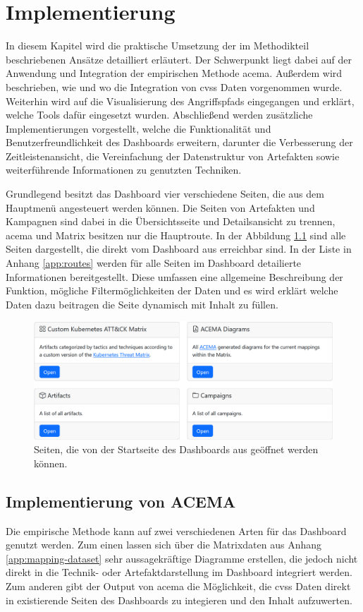 \chapter{Implementierung}
\label{chap:implementierung}
In diesem Kapitel wird die praktische Umsetzung der im Methodikteil beschriebenen Ansätze detailliert erläutert. Der Schwerpunkt liegt dabei auf der Anwendung und Integration der empirischen Methode \gls{acema}. Außerdem wird beschrieben, wie und wo die Integration von \gls{cvss} Daten vorgenommen wurde. Weiterhin wird auf die Visualisierung des Angriffspfads eingegangen und erklärt, welche Tools dafür eingesetzt wurden. Abschließend werden zusätzliche Implementierungen vorgestellt, welche die Funktionalität und Benutzerfreundlichkeit des Dashboards erweitern, darunter die Verbesserung der Zeitleistenansicht, die Vereinfachung der Datenstruktur von Artefakten sowie weiterführende Informationen zu genutzten Techniken.
\par Grundlegend besitzt das Dashboard vier verschiedene Seiten, die aus dem Hauptmenü angesteuert werden können. Die Seiten von Artefakten und Kampagnen sind dabei in die Übersichtsseite und Detailsansicht zu trennen, \gls{acema} und Matrix besitzen nur die Hauptroute. In der Abbildung \ref{fig:home} sind alle Seiten dargestellt, die direkt vom Dashboard aus erreichbar sind. In der Liste in Anhang \ref{app:routes} werden für alle Seiten im Dashboard detailierte Informationen bereitgestellt. Diese umfassen eine allgemeine Beschreibung der Funktion, mögliche Filtermöglichkeiten der Daten und es wird erklärt welche Daten dazu beitragen die Seite dynamisch mit Inhalt zu füllen.

\begin{figure}[!htb]
    \centering
    \includegraphics[width=1\textwidth]{images/home.png}
    \caption{Seiten, die von der Startseite des Dashboards aus geöffnet werden können.}
    \label{fig:home}
\end{figure}
\section{Implementierung von ACEMA}
Die empirische Methode kann auf zwei verschiedenen Arten für das Dashboard genutzt werden. Zum einen lassen sich über die Matrixdaten aus Anhang \ref{app:mapping-dataset} sehr aussagekräftige Diagramme erstellen, die jedoch nicht direkt in die Technik- oder Artefaktdarstellung im Dashboard integriert werden. Zum anderen gibt der Output von \gls{acema} die Möglichkeit, die \gls{cvss} Daten direkt in existierende Seiten des Dashboards zu integieren und den Inhalt aufzuwerten.

